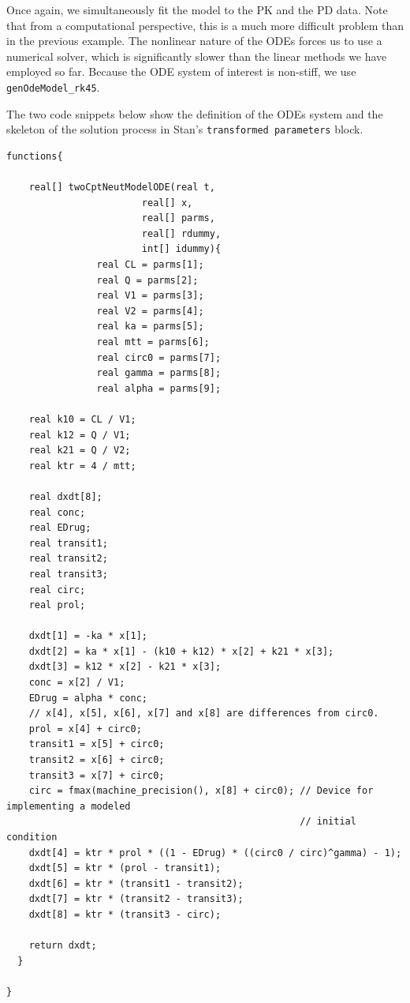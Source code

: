 \documentclass[11pt, reqno, oneside]{amsbook}
\numberwithin{equation}{chapter}
\numberwithin{figure}{chapter}
\numberwithin{table}{chapter}
\theoremstyle{remark}
\begin{document}
Once again, we simultaneously fit the model to the PK and the PD
data. Note that from a computational perspective, this is a much more
difficult problem than in the previous
example. The nonlinear nature of the ODEs forces us to use a numerical
solver, which is significantly slower than the linear methods we have
employed so far. Because the ODE system of interest is non-stiff, we
use \texttt{genOdeModel\_rk45}.

The two code snippets below show the definition of the ODEs
system and the skeleton of the solution process in Stan's
\texttt{transformed parameters} block.
\begin{verbatim}
functions{

    real[] twoCptNeutModelODE(real t,
                        real[] x,
                        real[] parms,
                        real[] rdummy,
                        int[] idummy){
                real CL = parms[1];
                real Q = parms[2];
                real V1 = parms[3];
                real V2 = parms[4];
                real ka = parms[5];
                real mtt = parms[6];
                real circ0 = parms[7];
                real gamma = parms[8];
                real alpha = parms[9];

    real k10 = CL / V1;
    real k12 = Q / V1;
    real k21 = Q / V2;
    real ktr = 4 / mtt;

    real dxdt[8];
    real conc;
    real EDrug;
    real transit1;
    real transit2;
    real transit3;
    real circ;
    real prol;

    dxdt[1] = -ka * x[1];
    dxdt[2] = ka * x[1] - (k10 + k12) * x[2] + k21 * x[3];
    dxdt[3] = k12 * x[2] - k21 * x[3];
    conc = x[2] / V1;
    EDrug = alpha * conc;
    // x[4], x[5], x[6], x[7] and x[8] are differences from circ0.
    prol = x[4] + circ0;
    transit1 = x[5] + circ0;
    transit2 = x[6] + circ0;
    transit3 = x[7] + circ0;
    circ = fmax(machine_precision(), x[8] + circ0); // Device for implementing a modeled 
                                                    // initial condition
    dxdt[4] = ktr * prol * ((1 - EDrug) * ((circ0 / circ)^gamma) - 1);
    dxdt[5] = ktr * (prol - transit1);
    dxdt[6] = ktr * (transit1 - transit2);
    dxdt[7] = ktr * (transit2 - transit3);
    dxdt[8] = ktr * (transit3 - circ);

    return dxdt;
  }

}
\end{verbatim}
\end{document}
